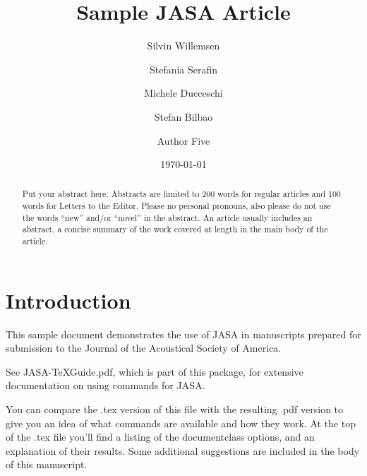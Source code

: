 \documentclass[preprint]{JASA}
\begin{document}
\title[JASA/Sample JASA Article]{Sample JASA Article}
\author{Silvin Willemsen}
\author{Stefania Serafin}

\author{Michele Ducceschi}
\author{Stefan Bilbao}
 
\author{Author Five}			



\date{\today} 

\begin{abstract}
Put your abstract here. Abstracts are limited to 200 words for
regular articles and 100 words for Letters to the Editor. Please no
personal pronouns, also please do not use the words ``new'' and/or
``novel'' in the abstract. An article usually includes an abstract, a
concise summary of the work covered at length in the main body of the
article.     
\end{abstract}


\maketitle




\section{\label{sec:1} Introduction}
This sample document demonstrates the use of JASA in manuscripts 
prepared for submission to the Journal of the Acoustical Society of America. 

See JASA-TeXGuide.pdf, which is part of this package, for extensive
documentation on using commands for JASA.

You can compare the .tex version of this file with the resulting .pdf
version to give you an idea of what  commands are available and how
they work. At the top of the .tex file you'll find a listing of the
documentclass options, and an explanation of their results.
Some additional suggestions are included in the body of this
manuscript.  
\end{document}
